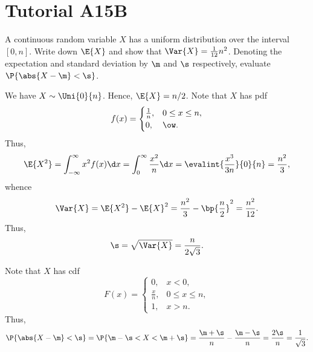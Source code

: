 \section{Tutorial A15B}

\begin{problem}
    A continuous random variable $X$ has a uniform distribution over the interval $[0, n]$. Write down $\E{X}$ and show that $\Var{X} = \frac1{12} n^2$. Denoting the expectation and standard deviation by $\m$ and $\s$ respectively, evaluate $\P{\abs{X - \m} < \s}$.
\end{problem}
\begin{solution}
    We have $X \sim \Uni{0}{n}$. Hence, $\E{X} = n/2$. Note that $X$ has pdf \[f(x) = \begin{cases}
        \frac1n, & 0 \leq x \leq n,\\
        0, & \ow.
    \end{cases}\] Thus, \[\E{X^2} = \int_{-\infty}^\infty x^2 f(x) \d x = \int_0^\infty \frac{x^2}{n} \d x = \evalint{\frac{x^3}{3n}}{0}{n} = \frac{n^2}{3},\] whence \[\Var{X} = \E{X^2} - \E{X}^2 = \frac{n^2}{3} - \bp{\frac{n}{2}}^2 = \frac{n^2}{12}.\] Thus, \[\s = \sqrt{\Var{X}} = \frac{n}{2\sqrt3}.\]

    Note that $X$ has cdf \[F(x) = \begin{cases}
        0, & x < 0,\\
        \frac{x}n, & 0 \leq x \leq n,\\
        1, & x > n.
    \end{cases}\] Thus, \[\P{\abs{X - \m} < \s} = \P{\m - \s < X < \m + \s} = \frac{\m + \s}{n} - \frac{\m - \s}{n} = \frac{2\s}{n} = \frac1{\sqrt3}.\]
\end{solution}

